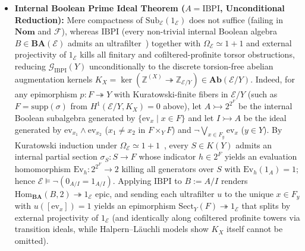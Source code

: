 \begin{itemize}
  \item \textbf{Internal Boolean Prime Ideal Theorem ($A = \mathrm{IBPI}$, Unconditional Reduction):} Mere compactness of $\mathrm{Sub}_{\mathcal{E}}(1_{\mathcal{E}})$ does not suffice (failing in $\mathbf{Nom}$ and $\mathcal{F}$), whereas $\mathrm{IBPI}$ (every non-trivial internal Boolean algebra $B \in \mathbf{BA}(\mathcal{E})$ admits an ultrafilter~\cite{Deligne72,Johnstone82}) together with $\Omega_{\mathcal{E}} \simeq 1+1$ and external projectivity of $1_{\mathcal{E}}$ kills all finitary and cofiltered-profinite torsor obstructions, reducing $\mathcal{G}_{\mathrm{IBPI}}(Y)$ unconditionally to the discrete torsion-free abelian augmentation kernels $K_X = \ker(\mathbb{Z}^{(X)} \twoheadrightarrow \mathbb{Z}_{\mathcal{E}/Y}) \in \mathbf{Ab}(\mathcal{E}/Y)$. Indeed, for any epimorphism $p : F \twoheadrightarrow Y$ with Kuratowski-finite fibers in $\mathcal{E}/Y$ (such as $F = \mathrm{supp}(\sigma)$ from $H^1(\mathcal{E}/Y, K_X) = 0$ above), let $A \rightarrowtail 2^{2^F}$ be the internal Boolean subalgebra generated by $\{\mathrm{ev}_x \mid x \in F\}$ and let $I \rightarrowtail A$ be the ideal generated by $\mathrm{ev}_{x_1} \wedge \mathrm{ev}_{x_2}$ ($x_1 \neq x_2$ in $F \times_Y F$) and $\neg \bigvee_{x \in F_y} \mathrm{ev}_x$ ($y \in Y$). By Kuratowski induction under $\Omega_{\mathcal{E}} \simeq 1+1$~\cite[\S D5.4]{Johnstone02}, every $S \in K(Y)$ admits an internal partial section $\sigma_S : S \to F$ whose indicator $h \in 2^F$ yields an evaluation homomorphism $\mathrm{Ev}_h : 2^{2^F} \to 2$ killing all generators over $S$ with $\mathrm{Ev}_h(1_A) = 1$; hence $\mathcal{E} \models \neg(0_{A/I} = 1_{A/I})$. Applying $\mathrm{IBPI}$ to $B := A/I$ renders $\mathrm{Hom}_{\mathbf{BA}}(B, 2) \twoheadrightarrow 1_{\mathcal{E}}$ epic, and sending each ultrafilter $u$ to the unique $x \in F_y$ with $u([\mathrm{ev}_x]) = 1$ yields an epimorphism $\mathrm{Sect}_Y(F) \twoheadrightarrow 1_{\mathcal{E}}$ that splits by external projectivity of $1_{\mathcal{E}}$ (and identically along cofiltered profinite towers via transition ideals, while Halpern--L\"auchli models show $K_X$ itself cannot be omitted).


\end{itemize}
